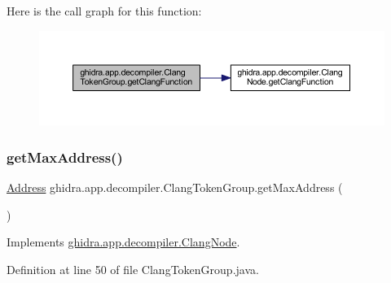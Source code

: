 Here is the call graph for this function\+:
\nopagebreak
\begin{figure}[H]
\begin{center}
\leavevmode
\includegraphics[width=350pt]{classghidra_1_1app_1_1decompiler_1_1_clang_token_group_a19473d47a4c0e53a664798541388518a_cgraph}
\end{center}
\end{figure}
\mbox{\label{classghidra_1_1app_1_1decompiler_1_1_clang_token_group_ab5ef3f19b60d99c92f3afed8c5ae411d}} 
\subsubsection{\texorpdfstring{getMaxAddress()}{getMaxAddress()}}
{\footnotesize\ttfamily \mbox{\hyperlink{class_address}{Address}} ghidra.\+app.\+decompiler.\+Clang\+Token\+Group.\+get\+Max\+Address (\begin{DoxyParamCaption}{ }\end{DoxyParamCaption})\hspace{0.3cm}{\ttfamily [inline]}}



Implements \mbox{\hyperlink{interfaceghidra_1_1app_1_1decompiler_1_1_clang_node_a91e8beccce17b875e07d7c0747b43a97}{ghidra.\+app.\+decompiler.\+Clang\+Node}}.



Definition at line 50 of file Clang\+Token\+Group.\+java.

\mbox{\label{classghidra_1_1app_1_1decompiler_1_1_clang_token_group_a2709c31b4d0db8b4f51d2191c33b7c2f}} 
